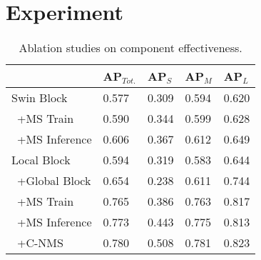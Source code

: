 

\section{Experiment}



\begin{table}[]
\centering

\caption{Ablation studies on component effectiveness.} 
	\vspace{-8pt}
\begin{tabularx}{0.47\textwidth}{l|XXXX}
\hline
              & AP$_{Tot.}$ & AP$_{S}$ & AP$_{M}$ & AP$_{L}$ \\ \hline
Swin Block      & 0.577        & 0.309    & 0.594    & 0.620    \\
\ +MS Train     & 0.590        & 0.344    & 0.599    & 0.628    \\
\ +MS Inference & 0.606        & 0.367    & 0.612    & 0.649    \\ \hline
Local Block     & 0.594        & 0.319    & 0.583    & 0.644    \\ 
\ +Global Block & 0.654        & 0.238    & 0.611    & 0.744    \\
\ +MS Train     & 0.765        & 0.386    & 0.763    & 0.817    \\
\ +MS Inference & 0.773        & 0.443    & 0.775    & 0.813    \\
\ +C-NMS        & 0.780        & 0.508    & 0.781    & 0.823    \\ \hline
\end{tabularx}
\label{tab:ablation}
\end{table}





